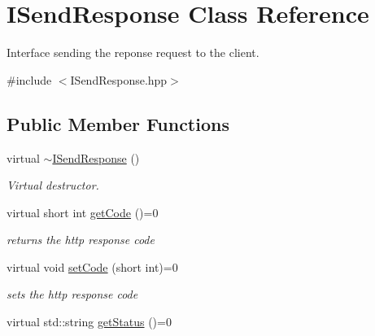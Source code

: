 \hypertarget{class_i_send_response}{}\section{I\+Send\+Response Class Reference}
\label{class_i_send_response}


Interface sending the reponse request to the client.  




{\ttfamily \#include $<$I\+Send\+Response.\+hpp$>$}

\subsection*{Public Member Functions}
\begin{DoxyCompactItemize}
\item 
\hypertarget{class_i_send_response_a86f091f4381129c776fe99e28e7fadb1}{}virtual \hyperlink{class_i_send_response_a86f091f4381129c776fe99e28e7fadb1}{$\sim$\+I\+Send\+Response} ()\label{class_i_send_response_a86f091f4381129c776fe99e28e7fadb1}

\begin{DoxyCompactList}\small\item\em Virtual destructor. \end{DoxyCompactList}\item 
\hypertarget{class_i_send_response_a57e4f79a4cb5d4ad3bf59072e24a7db0}{}virtual short int \hyperlink{class_i_send_response_a57e4f79a4cb5d4ad3bf59072e24a7db0}{get\+Code} ()=0\label{class_i_send_response_a57e4f79a4cb5d4ad3bf59072e24a7db0}

\begin{DoxyCompactList}\small\item\em returns the http response code \end{DoxyCompactList}\item 
\hypertarget{class_i_send_response_aa8e8e3c922293eedaef971ad919c160f}{}virtual void \hyperlink{class_i_send_response_aa8e8e3c922293eedaef971ad919c160f}{set\+Code} (short int)=0\label{class_i_send_response_aa8e8e3c922293eedaef971ad919c160f}

\begin{DoxyCompactList}\small\item\em sets the http response code \end{DoxyCompactList}\item 
\hypertarget{class_i_send_response_a9677c3a98475cab333b87f1c4a5bff75}{}virtual std\+::string \hyperlink{class_i_send_response_a9677c3a98475cab333b87f1c4a5bff75}{get\+Status} ()=0\label{class_i_send_response_a9677c3a98475cab333b87f1c4a5bff75}


\end{DoxyCompactItemize}

